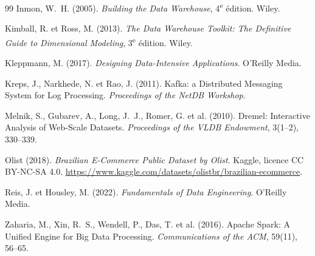 \begin{thebibliography}{99}
Inmon, W.~H. (2005).
\emph{Building the Data Warehouse}, 4\textsuperscript{e} édition.
Wiley.

Kimball, R. et Ross, M. (2013).
\emph{The Data Warehouse Toolkit: The Definitive Guide to Dimensional Modeling},
3\textsuperscript{e} édition. Wiley.

Kleppmann, M. (2017).
\emph{Designing Data-Intensive Applications}.
O'Reilly Media.

Kreps, J., Narkhede, N. et Rao, J. (2011).
Kafka: a Distributed Messaging System for Log Processing.
\emph{Proceedings of the NetDB Workshop}.

Melnik, S., Gubarev, A., Long, J.~J., Romer, G. et al. (2010).
Dremel: Interactive Analysis of Web-Scale Datasets.
\emph{Proceedings of the VLDB Endowment}, 3(1--2), 330--339.

Olist (2018).
\emph{Brazilian E-Commerce Public Dataset by Olist}.
Kaggle, licence CC BY-NC-SA 4.0.
\url{https://www.kaggle.com/datasets/olistbr/brazilian-ecommerce}.

Reis, J. et Housley, M. (2022).
\emph{Fundamentals of Data Engineering}.
O'Reilly Media.

Zaharia, M., Xin, R.~S., Wendell, P., Das, T. et al. (2016).
Apache Spark: A Unified Engine for Big Data Processing.
\emph{Communications of the ACM}, 59(11), 56--65.

\end{thebibliography}
